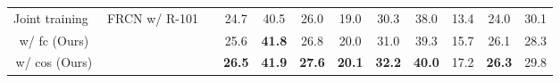 \begin{table}[t]
{\begin{tabular}{c|c|c|ccc|ccc|ccc}
			Joint training~\cite{gupta2019lvis} & \multirow{3}{*}{FRCN w/ R-101}  & \multirow{3}{*}{\checkmark} & 24.7 & 40.5 & 26.0 & 19.0 & 30.3 & 38.0 & 13.4 & 24.0 & 30.1 \\ 
			\model w/ fc (Ours) &  & & 25.6 & \textbf{41.8} & 26.8 & 20.0 & 31.0 & 39.3 & 15.7 & 26.1 & 28.3 \\
			\model w/ cos (Ours) & & & \cellcolor{Gray} \textbf{26.5} & \cellcolor{Gray}\textbf{41.9} & \cellcolor{Gray}\textbf{27.6} & \cellcolor{Gray}\textbf{20.1} & \cellcolor{Gray}\textbf{32.2} & \cellcolor{Gray}\textbf{40.0} & \cellcolor{Gray}17.2 & \cellcolor{Gray}\textbf{26.3} & \cellcolor{Gray}29.8 \\ 
			\bottomrule
	\end{tabular}}
	\label{tab:lvis_bench}
\end{table}


